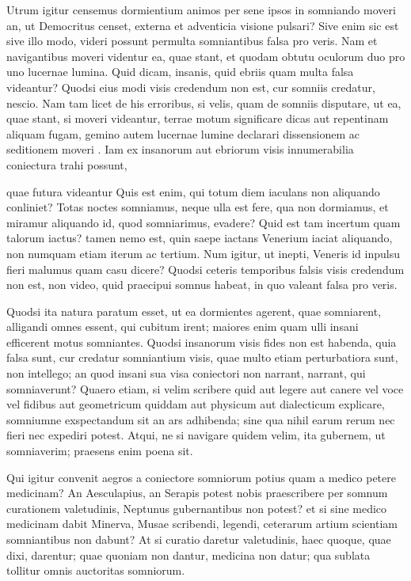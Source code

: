  Utrum igitur censemus dormientium animos per sene ipsos in somniando moveri an, ut Democritus censet, externa et adventicia visione pulsari? Sive enim sic est sive illo modo, videri possunt permulta somniantibus falsa pro veris. Nam et navigantibus moveri videntur ea, quae stant, et quodam obtutu oculorum duo pro uno lucernae lumina. Quid dicam, insanis, quid ebriis quam multa falsa videantur? Quodsi eius modi visis credendum non est, cur somniis credatur, nescio. Nam tam licet de his erroribus, si velis, quam de somniis disputare, ut ea, quae stant, si moveri videantur, terrae motum significare dicas aut repentinam aliquam fugam, gemino autem lucernae lumine declarari dissensionem ac seditionem moveri . Iam ex insanorum aut ebriorum visis innumerabilia coniectura trahi possunt,

 quae futura videantur Quis est enim, qui totum diem iaculans non aliquando conliniet? Totas noctes somniamus, neque ulla est fere, qua non dormiamus, et miramur aliquando id, quod somniarimus, evadere? Quid est tam incertum quam talorum iactus? tamen nemo est, quin saepe iactans Venerium iaciat aliquando, non numquam etiam iterum ac tertium. Num igitur, ut inepti, Veneris id inpulsu fieri malumus quam casu dicere? Quodsi ceteris temporibus falsis visis credendum non est, non video, quid praecipui somnus habeat, in quo valeant falsa pro veris.

 Quodsi ita natura paratum esset, ut ea dormientes agerent, quae somniarent, alligandi omnes essent, qui cubitum irent; maiores enim quam ulli insani efficerent motus somniantes. Quodsi insanorum visis fides non est habenda, quia falsa sunt, cur credatur somniantium visis, quae multo etiam perturbatiora sunt, non intellego; an quod insani sua visa coniectori non narrant, narrant, qui somniaverunt? Quaero etiam, si velim scribere quid aut legere aut canere vel voce vel fidibus aut geometricum quiddam aut physicum aut dialecticum explicare, somniumne exspectandum sit an ars adhibenda; sine qua nihil earum rerum nec fieri nec expediri potest. Atqui, ne si navigare quidem velim, ita gubernem, ut somniaverim; praesens enim poena sit.

 Qui igitur convenit aegros a coniectore somniorum potius quam a medico petere medicinam? An Aesculapius, an Serapis potest nobis praescribere per somnum curationem valetudinis, Neptunus gubernantibus non potest? et si sine medico medicinam dabit Minerva, Musae scribendi, legendi, ceterarum artium scientiam somniantibus non dabunt? At si curatio daretur valetudinis, haec quoque, quae dixi, darentur; quae quoniam non dantur, medicina non datur; qua sublata tollitur omnis auctoritas somniorum.

